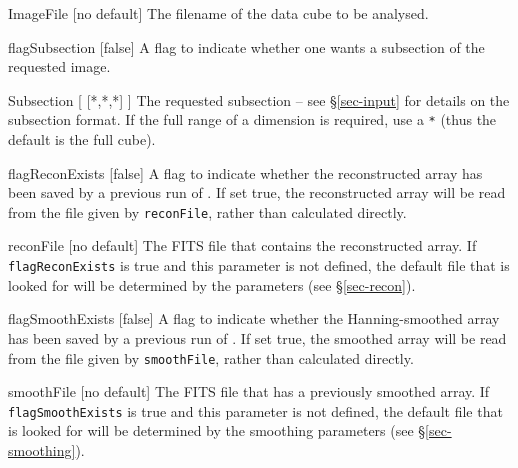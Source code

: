 \begin{Lentry}
\item[{ImageFile [no default]}] The filename of the
  data cube to be analysed. 
\item[{flagSubsection [false]}] A flag to indicate whether one
  wants a subsection of the requested image.
\item[{Subsection [ [*,*,*] ]}] The requested subsection
 -- see \S\ref{sec-input} for details on the subsection format.  If
 the full range of a dimension is required, use a \texttt{*} (thus the
 default is the full cube).
\item[{flagReconExists [false]}] A flag to indicate whether the
  reconstructed array has been saved by a previous run of \duchamp. If
  set true, the reconstructed array will be read from the file given
  by \texttt{reconFile}, rather than calculated directly.
\item[{reconFile [no default]}] The FITS file that contains the
  reconstructed array. If \texttt{flagReconExists} is true and this
  parameter is not defined, the default file that is looked for will
  be determined by the \atrous parameters (see \S\ref{sec-recon}).
\item[{flagSmoothExists [false]}] A flag to indicate whether the
  Hanning-smoothed array has been saved by a previous run of \duchamp. If
  set true, the smoothed array will be read from the file given
  by \texttt{smoothFile}, rather than calculated directly.
\item[{smoothFile [no default]}] The FITS file that has
  a previously smoothed array. If \texttt{flagSmoothExists}
  is true and this parameter is not defined, the default file that is
  looked for will be determined by the smoothing parameters (see
  \S\ref{sec-smoothing}).
\end{Lentry}

